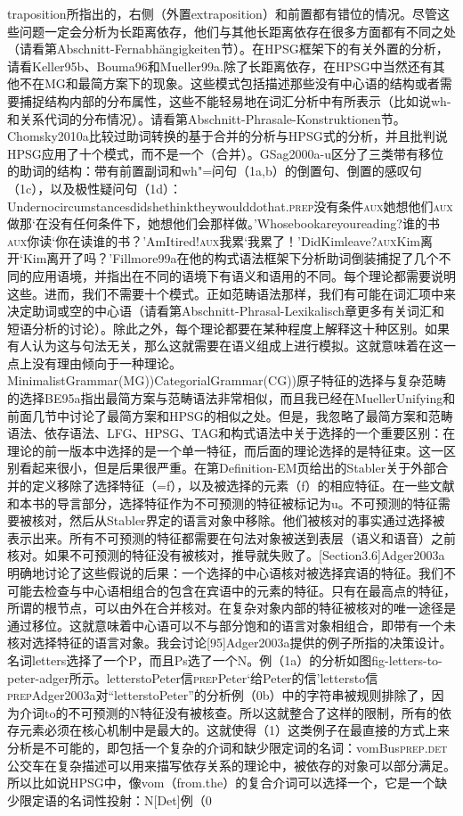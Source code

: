 traposition所指出的，右侧（外置extraposition）和前置都有错位的情况。尽管这些问题一定会分析为长距离依存，他们与其他长距离依存在很多方面都有不同之处（请看第Abschnitt-Fernabhängigkeiten节）。在HPSG框架下的有关外置的分析，请看Keller95b、Bouma96和Mueller99a.除了长距离依存，在HPSG中当然还有其他不在MG和最简方案下的现象。这些模式包括描述那些没有中心语的结构或者需要捕捉结构内部的分布属性，这些不能轻易地在词汇分析中有所表示（比如说wh-和关系代词的分布情况）。请看第Abschnitt-Phrasale-Konstruktionen节。Chomsky2010a比较过助词转换的基于合并的分析与HPSG式的分析，并且批判说HPSG应用了十个模式，而不是一个（合并）。GSag2000a-u区分了三类带有移位的助词的结构：带有前置副词和wh"=问句（1a,b）的倒置句、倒置的感叹句（1c），以及极性疑问句（1d）：Undernocircumstancesdidshethinktheywoulddothat.\textsc{prep}没有条件\textsc{aux}她想他们\textsc{aux}做那`在没有任何条件下，她想他们会那样做。'Whosebookareyoureading?谁的书\textsc{aux}你读`你在读谁的书？'AmItired!\textsc{aux}我累`我累了！'DidKimleave?\textsc{aux}Kim离开`Kim离开了吗？'Fillmore99a在他的构式语法框架下分析助词倒装捕捉了几个不同的应用语境，并指出在不同的语境下有语义和语用的不同。每个理论都需要说明这些。进而，我们不需要十个模式。正如范畴语法那样，我们有可能在词汇项中来决定助词或空的中心语（请看第Abschnitt-Phrasal-Lexikalisch章更多有关词汇和短语分析的讨论）。除此之外，每个理论都要在某种程度上解释这十种区别。如果有人认为这与句法无关，那么这就需要在语义组成上进行模拟。这就意味着在这一点上没有理由倾向于一种理论。MinimalistGrammar(MG))CategorialGrammar(CG))原子特征的选择与复杂范畴的选择BE95a指出最简方案与范畴语法非常相似，而且我已经在MuellerUnifying和前面几节中讨论了最简方案和HPSG的相似之处。但是，我忽略了最简方案和范畴语法、依存语法、LFG、HPSG、TAG和构式语法中关于选择的一个重要区别：在理论的前一版本中选择的是一个单一特征，而后面的理论选择的是特征束。这一区别看起来很小，但是后果很严重。在第Definition-EM页给出的Stabler关于外部合并的定义移除了选择特征（=f），以及被选择的元素（f）的相应特征。在一些文献和本书的导言部分，选择特征作为不可预测的特征被标记为u。不可预测的特征需要被核对，然后从Stabler界定的语言对象中移除。他们被核对的事实通过选择被表示出来。所有不可预测的特征都需要在句法对象被送到表层（语义和语音）之前核对。如果不可预测的特征没有被核对，推导就失败了。[Section3.6]Adger2003a明确地讨论了这些假说的后果：一个选择的中心语核对被选择宾语的特征。我们不可能去检查与中心语相组合的包含在宾语中的元素的特征。只有在最高点的特征，所谓的根节点，可以由外在合并核对。在复杂对象内部的特征被核对的唯一途径是通过移位。这就意味着中心语可以不与部分饱和的语言对象相组合，即带有一个未核对选择特征的语言对象。我会讨论[95]Adger2003a提供的例子所指的决策设计。名词letters选择了一个P，而且Ps选了一个N。例（1a）的分析如图fig-letters-to-peter-adger所示。letterstoPeter信\textsc{prep}Peter`给Peter的信'lettersto信\textsc{prep}Adger2003a对“letterstoPeter”的分析例（0b）中的字符串被规则排除了，因为介词to的不可预测的N特征没有被核查。所以这就整合了这样的限制，所有的依存元素必须在核心机制中是最大的。这就使得（1）这类例子在最直接的方式上来分析是不可能的，即包括一个复杂的介词和缺少限定词的名词：vomBus\textsc{prep}.\textsc{det}公交车在复杂描述可以用来描写依存关系的理论中，被依存的对象可以部分满足。所以比如说HPSG中，像vom（from.the）的复合介词可以选择一个，它是一个缺少限定语的名词性投射：N[Det]例（0